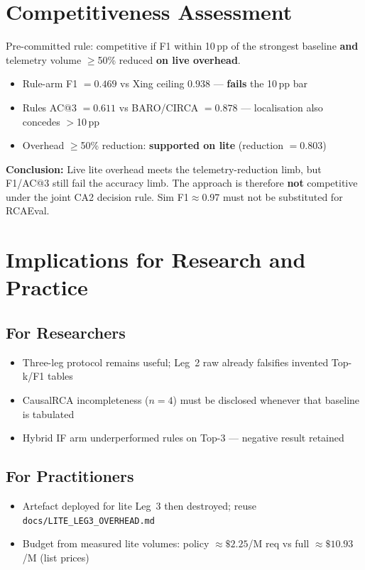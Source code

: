 \section{Competitiveness Assessment}

Pre-committed rule: competitive if F1 within 10\,pp of the strongest baseline \textbf{and} telemetry volume $\geq$50\% reduced \textbf{on live overhead}.

\begin{itemize}
    \item Rule-arm F1 $=0.469$ vs Xing ceiling $0.938$ --- \textbf{fails} the 10\,pp bar
    \item Rules AC@3 $=0.611$ vs BARO/CIRCA $=0.878$ --- localisation also concedes $>$10\,pp
    \item Overhead $\geq$50\% reduction: \textbf{supported on lite} (reduction $=0.803$)
\end{itemize}

\textbf{Conclusion:} Live lite overhead meets the telemetry-reduction limb, but F1/AC@3 still fail the accuracy limb. The approach is therefore \textbf{not} competitive under the joint CA2 decision rule. Sim F1$\approx$0.97 must not be substituted for RCAEval.

\section{Implications for Research and Practice}

\subsection{For Researchers}
\begin{itemize}
    \item Three-leg protocol remains useful; Leg~2 raw already falsifies invented Top-k/F1 tables
    \item CausalRCA incompleteness ($n{=}4$) must be disclosed whenever that baseline is tabulated
    \item Hybrid IF arm underperformed rules on Top-3 --- negative result retained
\end{itemize}

\subsection{For Practitioners}
\begin{itemize}
    \item Artefact deployed for lite Leg~3 then destroyed; reuse \texttt{docs/LITE\_LEG3\_OVERHEAD.md}
    \item Budget from measured lite volumes: policy $\approx\$2.25$/M req vs full $\approx\$10.93$/M (list prices)
\end{itemize}

